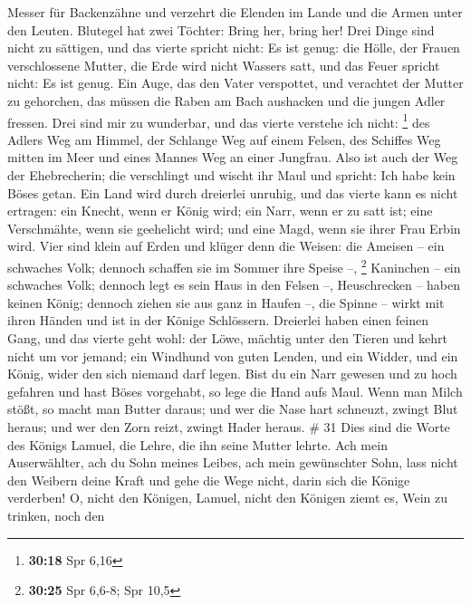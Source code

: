 Messer für Backenzähne und verzehrt die Elenden im Lande und die Armen
unter den Leuten.  Blutegel hat zwei Töchter: Bring her,
bring her! Drei Dinge sind nicht zu sättigen, und das vierte spricht
nicht: Es ist genug:  die Hölle, der Frauen verschlossene
Mutter, die Erde wird nicht Wassers satt, und das Feuer spricht nicht:
Es ist genug.  Ein Auge, das den Vater verspottet, und
verachtet der Mutter zu gehorchen, das müssen die Raben am Bach
aushacken und die jungen Adler fressen.  Drei sind mir zu
wunderbar, und das vierte verstehe ich nicht: \footnote{\textbf{30:18}
  Spr 6,16}  des Adlers Weg am Himmel, der Schlange Weg
auf einem Felsen, des Schiffes Weg mitten im Meer und eines Mannes Weg
an einer Jungfrau.  Also ist auch der Weg der
Ehebrecherin; die verschlingt und wischt ihr Maul und spricht: Ich habe
kein Böses getan.  Ein Land wird durch dreierlei unruhig,
und das vierte kann es nicht ertragen:  ein Knecht, wenn
er König wird; ein Narr, wenn er zu satt ist;  eine
Verschmähte, wenn sie geehelicht wird; und eine Magd, wenn sie ihrer
Frau Erbin wird.  Vier sind klein auf Erden und klüger
denn die Weisen:  die Ameisen -- ein schwaches Volk;
dennoch schaffen sie im Sommer ihre Speise --, \footnote{\textbf{30:25}
  Spr 6,6-8; Spr 10,5}  Kaninchen -- ein schwaches Volk;
dennoch legt es sein Haus in den Felsen --,  Heuschrecken
-- haben keinen König; dennoch ziehen sie aus ganz in Haufen --,
 die Spinne -- wirkt mit ihren Händen und ist in der
Könige Schlössern.  Dreierlei haben einen feinen Gang,
und das vierte geht wohl:  der Löwe, mächtig unter den
Tieren und kehrt nicht um vor jemand;  ein Windhund von
guten Lenden, und ein Widder, und ein König, wider den sich niemand darf
legen.  Bist du ein Narr gewesen und zu hoch gefahren und
hast Böses vorgehabt, so lege die Hand aufs Maul.  Wenn
man Milch stößt, so macht man Butter daraus; und wer die Nase hart
schneuzt, zwingt Blut heraus; und wer den Zorn reizt, zwingt Hader
heraus. \# 31  Dies sind die Worte des Königs Lamuel, die
Lehre, die ihn seine Mutter lehrte.  Ach mein
Auserwählter, ach du Sohn meines Leibes, ach mein gewünschter Sohn,
 lass nicht den Weibern deine Kraft und gehe die Wege
nicht, darin sich die Könige verderben!  O, nicht den
Königen, Lamuel, nicht den Königen ziemt es, Wein zu trinken, noch den
